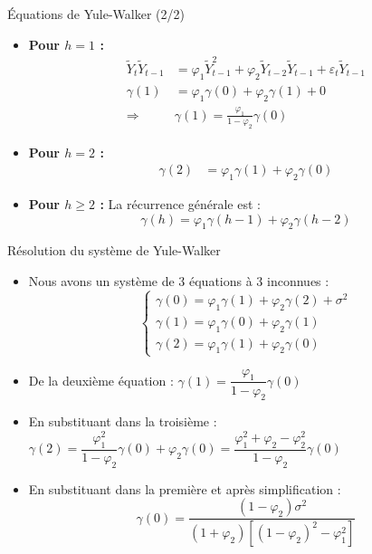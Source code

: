 \documentclass[11pt,aspectratio=169]{beamer}
\begin{document}
\begin{frame}{Équations de Yule-Walker (2/2)}

\begin{itemize}

\item \textbf{Pour $h = 1$ :}
\begin{align*}
\tilde{Y}_t \tilde{Y}_{t-1} &= \varphi_1 \tilde{Y}_{t-1}^2 + \varphi_2 \tilde{Y}_{t-2} \tilde{Y}_{t-1} + \varepsilon_t \tilde{Y}_{t-1} \\
\gamma(1) &= \varphi_1 \gamma(0) + \varphi_2 \gamma(1) + 0 \\
\Rightarrow \quad &\boxed{\gamma(1) = \frac{\varphi_1}{1 - \varphi_2} \gamma(0)}
\end{align*}

\item \textbf{Pour $h = 2$ :}
\begin{align*}
\gamma(2) &= \varphi_1 \gamma(1) + \varphi_2 \gamma(0)
\end{align*}

\item \textbf{Pour $h \geq 2$ :} La récurrence générale est :
\[
\boxed{\gamma(h) = \varphi_1 \gamma(h-1) + \varphi_2 \gamma(h-2)}
\]

\end{itemize}
\end{frame}

\begin{frame}{Résolution du système de Yule-Walker}

\begin{itemize}

\item Nous avons un système de 3 équations à 3 inconnues :
\[
\begin{cases}
\gamma(0) = \varphi_1 \gamma(1) + \varphi_2 \gamma(2) + \sigma^2 \\
\gamma(1) = \varphi_1 \gamma(0) + \varphi_2 \gamma(1) \\
\gamma(2) = \varphi_1 \gamma(1) + \varphi_2 \gamma(0)
\end{cases}
\]

\item De la deuxième équation : $\gamma(1) = \dfrac{\varphi_1}{1 - \varphi_2} \gamma(0)$\newline

\item En substituant dans la troisième : $\gamma(2) = \dfrac{\varphi_1^2}{1 - \varphi_2} \gamma(0) + \varphi_2 \gamma(0) = \dfrac{\varphi_1^2 + \varphi_2 - \varphi_2^2}{1 - \varphi_2} \gamma(0)$\newline

\item En substituant dans la première et après simplification :
\[
\boxed{\gamma(0) = \frac{(1 - \varphi_2) \sigma^2}{(1 + \varphi_2)[(1 - \varphi_2)^2 - \varphi_1^2]}}
\]

\end{itemize}
\end{frame}
\end{document}
